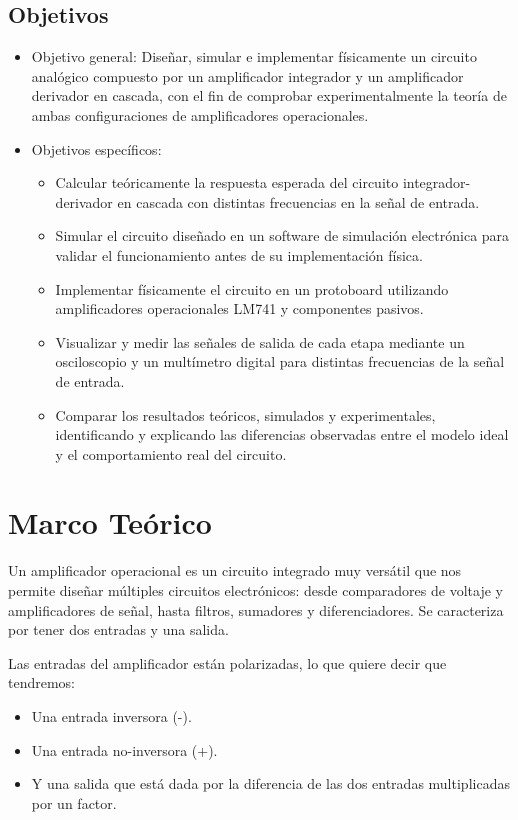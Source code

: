 \documentclass[conference]{IEEEtran}
\begin{document}
\subsection{Objetivos}
\begin{itemize}
    \item Objetivo general: Diseñar, simular e implementar físicamente un circuito analógico compuesto por un amplificador integrador y un amplificador derivador en cascada, con el fin de comprobar experimentalmente la teoría de ambas configuraciones de amplificadores operacionales.
    \item Objetivos específicos:
    \begin{itemize}
        \item Calcular teóricamente la respuesta esperada del circuito integrador-derivador en cascada con distintas frecuencias en la señal de entrada.
        \item Simular el circuito diseñado en un software de simulación electrónica para validar el funcionamiento antes de su implementación física.
        \item Implementar físicamente el circuito en un protoboard utilizando amplificadores operacionales LM741 y componentes pasivos.
        \item Visualizar y medir las señales de salida de cada etapa mediante un osciloscopio y un multímetro digital para distintas frecuencias de la señal de entrada.
        \item Comparar los resultados teóricos, simulados y experimentales, identificando y explicando las diferencias observadas entre el modelo ideal y el comportamiento real del circuito.
    \end{itemize}
\end{itemize}

\section{Marco Teórico}
Un amplificador operacional es un circuito integrado muy versátil que nos permite diseñar múltiples circuitos electrónicos: desde comparadores de voltaje y amplificadores de señal, hasta filtros, sumadores y diferenciadores. Se caracteriza por tener dos entradas y una salida.

Las entradas del amplificador están polarizadas, lo que quiere decir que tendremos:
\begin{itemize}
	\item{Una entrada inversora (-).}
	\item{Una entrada no-inversora (+).}
	\item{Y una salida que está dada por la diferencia de las dos entradas multiplicadas por un factor.}
\end{itemize}
\end{document}

